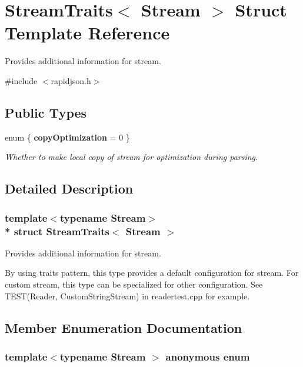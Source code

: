 \hypertarget{struct_stream_traits}{}\section{Stream\+Traits$<$ Stream $>$ Struct Template Reference}
\label{struct_stream_traits}


Provides additional information for stream.  




{\ttfamily \#include $<$rapidjson.\+h$>$}

\subsection*{Public Types}
\begin{DoxyCompactItemize}
\item 
enum \{ {\bfseries copy\+Optimization} = 0
 \}\begin{DoxyCompactList}\small\item\em Whether to make local copy of stream for optimization during parsing. \end{DoxyCompactList}
\end{DoxyCompactItemize}


\subsection{Detailed Description}
\subsubsection*{template$<$typename Stream$>$\\*
struct Stream\+Traits$<$ Stream $>$}

Provides additional information for stream. 

By using traits pattern, this type provides a default configuration for stream. For custom stream, this type can be specialized for other configuration. See T\+E\+S\+T(\+Reader, Custom\+String\+Stream) in readertest.\+cpp for example. 

\subsection{Member Enumeration Documentation}
\subsubsection[{\texorpdfstring{anonymous enum}{anonymous enum}}]{\setlength{\rightskip}{0pt plus 5cm}template$<$typename Stream $>$ anonymous enum}\hypertarget{struct_stream_traits_a749c8e626640da50f5827f93007fcc37}{}\label{struct_stream_traits_a749c8e626640da50f5827f93007fcc37}


